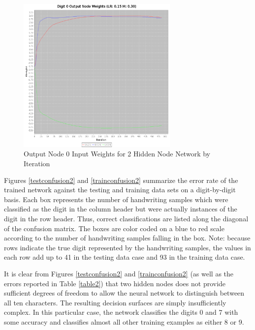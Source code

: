 \documentclass{article}
\begin{document}
\begin{figure}
\centering
\includegraphics[width=0.7\textwidth]{data/final/2_hidden_node_0weight.png}
\caption{Output Node 0 Input Weights for 2 Hidden Node Network by Iteration}
\label{weight2}
\end{figure}

Figures \ref{testconfusion2} and \ref{trainconfusion2} summarize the error rate of the trained network against the testing and training data sets on a digit-by-digit basis. Each box represents the number of handwriting samples which were classified as the digit in the column header but were actually instances of the digit in the row header. Thus, correct classifications are listed along the diagonal of the confusion matrix. The boxes are color coded on a blue to red scale according to the number of handwriting samples falling in the box. Note: because rows indicate the true digit represented by the handwriting samples, the values in each row add up to 41 in the testing data case and 93 in the training data case.

It is clear from Figures \ref{testconfusion2} and \ref{trainconfusion2} (as well as the errors reported in Table \ref{table2}) that two hidden nodes does not provide sufficient degrees of freedom to allow the neural network to distinguish between all ten characters. The resulting decision surfaces are simply insufficiently complex. In this particular case, the network classifies the digits 0 and 7 with some accuracy and classifies almost all other training examples as either 8 or 9.
\end{document}
